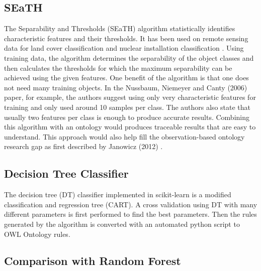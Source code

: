 \documentclass[authoryear, review,12pt,number]{elsarticle}
\begin{document}
\subsection{SEaTH}
The Separability and Thresholds (SEaTH) algorithm
\citep{Nussbaum2006} statistically identifies characteristic features and their thresholds. It has
been used on remote sensing data for land cover classification \citep{Gao2011}
and nuclear installation classification \citep{Nussbaum2006}.
Using training data, the algorithm determines the separability of the object
classes and then calculates the thresholds for which the maximum separability
can be achieved using the given features. One benefit of the algorithm is that
one does not need many training objects.
In the Nussbaum, Niemeyer and Canty (2006) paper, for example, the authors
suggest using only very characteristic features for training and only used
around 10 samples per class\citep{Nussbaum2006}. The authors also state that
usually two features per class is enough to produce accurate results. Combining
this algorithm with an ontology would produces traceable results that are easy
to understand. This approach would also help fill the observation-based ontology
research gap as first described by Janowicz (2012) \citep{Janowicz2012}.

\subsection{Decision Tree Classifier}
The decision tree (DT) classifier implemented in scikit-learn is a modified
classification and regression tree (CART)\citep{scikit-learn}. A cross
validation using DT with many different parameters is first performed to find the best
parameters. Then the rules generated by the algorithm is converted with an
automated python script to OWL Ontology rules.

\subsection{Comparison with Random Forest}
\end{document}
